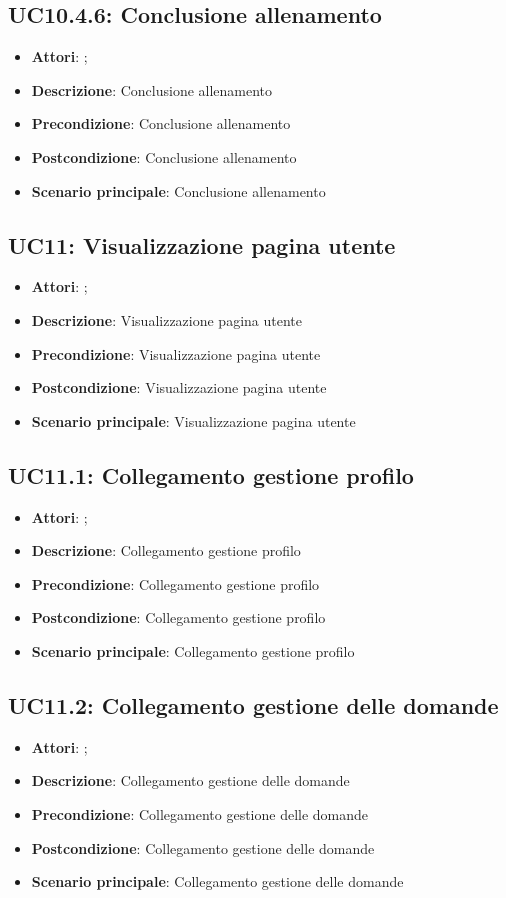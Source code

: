 \subsection{UC10.4.6: Conclusione allenamento}
\label{UC10.4.6}
\begin{itemize}
\item \textbf{Attori}: ;
\item \textbf{Descrizione}: Conclusione allenamento
\item \textbf{Precondizione}: Conclusione allenamento
\item \textbf{Postcondizione}: Conclusione allenamento
\item \textbf{Scenario principale}:
Conclusione allenamento
\end{itemize}

\subsection{UC11: Visualizzazione pagina utente}
\label{UC11}
\begin{itemize}
\item \textbf{Attori}: ;
\item \textbf{Descrizione}: Visualizzazione pagina utente
\item \textbf{Precondizione}: Visualizzazione pagina utente
\item \textbf{Postcondizione}: Visualizzazione pagina utente
\item \textbf{Scenario principale}:
Visualizzazione pagina utente
\end{itemize}

\subsection{UC11.1: Collegamento gestione profilo}
\label{UC11.1}
\begin{itemize}
\item \textbf{Attori}: ;
\item \textbf{Descrizione}: Collegamento gestione profilo
\item \textbf{Precondizione}: Collegamento gestione profilo
\item \textbf{Postcondizione}: Collegamento gestione profilo
\item \textbf{Scenario principale}:
Collegamento gestione profilo
\end{itemize}

\subsection{UC11.2: Collegamento gestione delle domande}
\label{UC11.2}
\begin{itemize}
\item \textbf{Attori}: ;
\item \textbf{Descrizione}: Collegamento gestione delle domande
\item \textbf{Precondizione}: Collegamento gestione delle domande
\item \textbf{Postcondizione}: Collegamento gestione delle domande
\item \textbf{Scenario principale}:
Collegamento gestione delle domande
\end{itemize}

